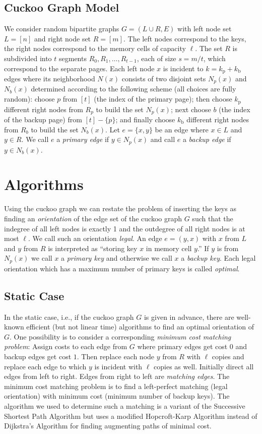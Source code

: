\let\accentvec\vec \documentclass{llncs}
\newcommand{\kprim}{{k_{\mathrm{p}}}}
\newcommand{\kback}{{k_{\mathrm{b}}}}
\newcommand{\ie}{i.e.}
\begin{document}
\subsection{Cuckoo Graph Model}
\label{sec:graphModel}
We consider random bipartite graphs $G=(L \cup R ,E )$ with left node set $L=[n]$ and right node set $R=[m]$.
The left nodes correspond to the keys, the right nodes correspond to the memory cells of capacity $\ell$. The set $R$ is subdivided into $t$ segments $R_0,R_1,\ldots,R_{t-1}$, each of size $s=m/t$, which correspond to the separate pages.
Each left node $x$ is incident to $k=\kprim+\kback$ edges where its neighborhood $N(x)$ consists of two disjoint sets $N_p(x)$ and $N_b(x)$ determined according to the following scheme (all choices are fully random): choose $p$ from $[t]$ (the index of the primary page); then choose $\kprim$ different right nodes from $R_p$ to build the set $N_p(x)$; next choose $b$ (the index of the backup page) from $[t]-\{p\}$; and finally choose $\kback$ different right nodes from $R_b$ to build the set $N_b(x)$. Let $e=\{x,y\}$ be an edge where $x\in L$ and $y\in R$. We call $e$ a \emph{primary edge} if $y \in N_p(x)$ and call $e$ a \emph{backup edge} if $y \in N_b(x)$.

\section{Algorithms}
Using the cuckoo graph we can restate the problem of inserting the keys as finding an \emph{orientation} of the edge set of the cuckoo graph $G$ such that the indegree of all left nodes is exactly 1 and the outdegree of all right nodes is at most $\ell$.
We call such an orientation \emph{legal}. An edge $e=(y,x)$ with $x$ from $L$ and $y$ from $R$ is interpreted as ``storing key $x$ in memory cell $y$.'' If $y$ is from $N_p(x)$ we call $x$ a \emph{primary key} and otherwise we call $x$ a \emph{backup key}.
Each legal orientation which has a maximum number of primary keys is called \emph{optimal}.

\subsection{Static Case}
In the static case, \ie, if the cuckoo graph $G$ is given in advance, 
there are well-known efficient (but not linear time) algorithms to find an optimal orientation of $G$. One possibility is 
to consider a corresponding \emph{minimum cost matching problem}:
Assign costs to each edge from $G$ where primary edges get cost $0$ and backup edges get cost $1$.
Then replace each node $y$ from $R$ with $\ell$ copies and replace each edge to which $y$ is incident with $\ell$ copies as well.
Initially direct all edges from left to right. Edges from right to left are \emph{matching edges}. The minimum cost matching problem is to find a left-perfect matching (legal orientation) with minimum cost (minimum number of backup keys).
The algorithm we used to determine such a matching is a variant of the Successive Shortest Path Algorithm \cite{network_flows} but uses a modified Hopcroft-Karp Algorithm instead of Dijkstra's Algorithm for finding augmenting paths of minimal cost. 
\end{document}
